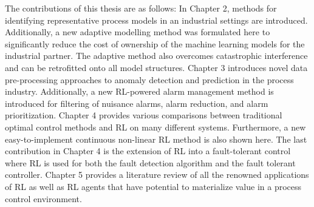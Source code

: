 The contributions of this thesis are as follows: In Chapter 2, methods for identifying representative process models in an industrial settings are introduced. Additionally, a new adaptive modelling method was formulated here to significantly reduce the cost of ownership of the machine learning models for the industrial partner. The adaptive method also overcomes catastrophic interference and can be retrofitted onto all model structures. Chapter 3 introduces novel data pre-processing approaches to anomaly detection and prediction in the process industry.  Additionally, a new RL-powered alarm management method is introduced for filtering of nuisance alarms, alarm reduction, and alarm prioritization.  Chapter 4 provides various comparisons between traditional optimal control methods and RL on many different systems. Furthermore, a new easy-to-implement continuous non-linear RL method is also shown here.  The last contribution in Chapter 4 is the extension of RL into a fault-tolerant control where RL is used for both the fault detection algorithm and the fault tolerant controller. Chapter 5 provides a literature review of all the renowned applications of RL as well as RL agents that have potential to materialize value in a process control environment.



% 


% 


% 



% 
